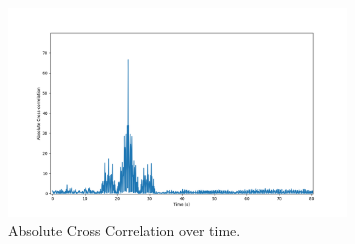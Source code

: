 \documentclass[12pt,a4paper,twoside,openright]{report}
\begin{document}
\begin{figure}[h!]
	\centerline{\includegraphics[width=0.8\textwidth]{figs/cross-correlation.png}}
	\caption{Absolute Cross Correlation over time. }
	\label{fig:cross-correlation}
\end{figure}
\end{document}
